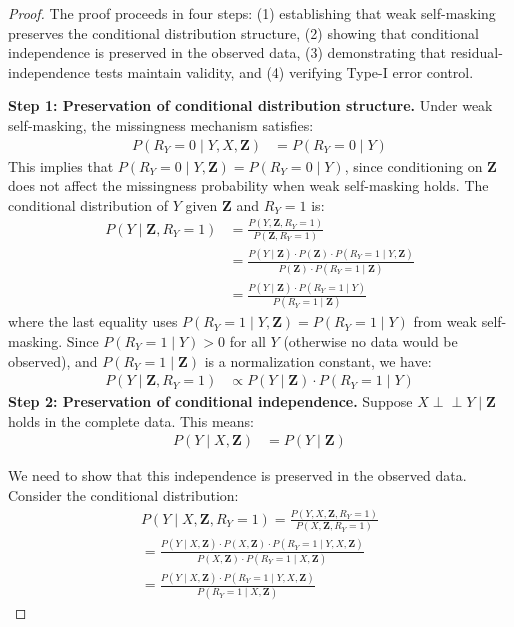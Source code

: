 \documentclass[runningheads]{llncs}
\begin{document}
\begin{proof}
The proof proceeds in four steps: (1) establishing that weak self-masking preserves the conditional distribution structure, (2) showing that conditional independence is preserved in the observed data, (3) demonstrating that residual-independence tests maintain validity, and (4) verifying Type-I error control.

\vspace{0.1cm}
\textbf{Step 1: Preservation of conditional distribution structure.}
Under weak self-masking, the missingness mechanism satisfies:
\begin{align}
P(R_Y = 0 \mid Y, X, \mathbf{Z}) &= P(R_Y = 0 \mid Y) \label{eq:weak_self_masking_main}
\end{align}
This implies that $P(R_Y = 0 \mid Y, \mathbf{Z}) = P(R_Y = 0 \mid Y)$, since conditioning on $\mathbf{Z}$ does not affect the missingness probability when weak self-masking holds.
The conditional distribution of $Y$ given $\mathbf{Z}$ and $R_Y = 1$ is:
{\small  
\begin{align}
P(Y \mid \mathbf{Z}, R_Y = 1) &= \frac{P(Y, \mathbf{Z}, R_Y = 1)}{P(\mathbf{Z}, R_Y = 1)} \nonumber \\
&= \frac{P(Y \mid \mathbf{Z}) \cdot P(\mathbf{Z}) \cdot P(R_Y = 1 \mid Y, \mathbf{Z})}{P(\mathbf{Z}) \cdot P(R_Y = 1 \mid \mathbf{Z})} \nonumber \\
&= \frac{P(Y \mid \mathbf{Z}) \cdot P(R_Y = 1 \mid Y)}{P(R_Y = 1 \mid \mathbf{Z})} \label{eq:conditional_dist}
\end{align}
}
where the last equality uses $P(R_Y = 1 \mid Y, \mathbf{Z}) = P(R_Y = 1 \mid Y)$ from weak self-masking.
Since $P(R_Y = 1 \mid Y) > 0$ for all $Y$ (otherwise no data would be observed), and $P(R_Y = 1 \mid \mathbf{Z})$ is a normalization constant, we have:
{\small  
\begin{align}
P(Y \mid \mathbf{Z}, R_Y = 1) &\propto P(Y \mid \mathbf{Z}) \cdot P(R_Y = 1 \mid Y) \label{eq:proportional}
\end{align}
}
\textbf{Step 2: Preservation of conditional independence.}
Suppose $X \perp\!\!\!\perp Y \mid \mathbf{Z}$ holds in the complete data. This means:
\begin{align}
P(Y \mid X, \mathbf{Z}) &= P(Y \mid \mathbf{Z}) \label{eq:ci_complete}
\end{align}

We need to show that this independence is preserved in the observed data. Consider the conditional distribution:
\begin{align}
P(Y \mid X, \mathbf{Z}, R_Y = 1)
= \frac{P(Y, X, \mathbf{Z}, R_Y = 1)}{P(X, \mathbf{Z}, R_Y = 1)} \nonumber \\
= \frac{
    P(Y \mid X, \mathbf{Z}) \cdot P(X, \mathbf{Z}) \cdot
    P(R_Y = 1 \mid Y, X, \mathbf{Z})
}{
    P(X, \mathbf{Z}) \cdot P(R_Y = 1 \mid X, \mathbf{Z})
} \nonumber\\
= \frac{
    P(Y \mid X, \mathbf{Z}) \cdot P(R_Y = 1 \mid Y, X, \mathbf{Z})
}{
    P(R_Y = 1 \mid X, \mathbf{Z})
} \nonumber
\end{align}



\end{proof}
\end{document}
